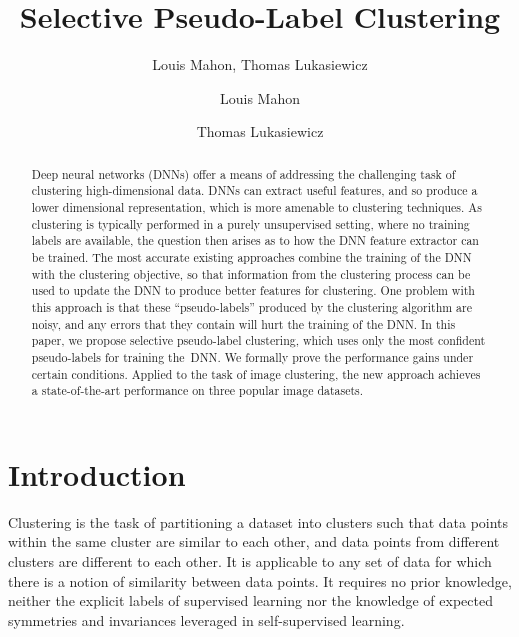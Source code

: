 \documentclass[runningheads]{llncs}
\begin{document}
\title{Selective Pseudo-Label Clustering}
\author{Louis Mahon, Thomas Lukasiewicz}
\author{Louis Mahon \and
Thomas Lukasiewicz}



\maketitle              

\begin{abstract}
Deep neural networks (DNNs) offer a means of addressing the challenging task of clustering high-dimensional data. DNNs can extract useful features, and so produce a lower dimensional representation, which is more amenable to clustering techniques. As clustering is typically performed in a purely unsupervised setting, where no training labels are available, the question then arises as to how the DNN feature extractor can be trained. The most accurate existing approaches combine the training of the DNN with the clustering objective, so that information from the clustering process can be used to update the DNN to produce better features for clustering. One problem with this approach is that these ``pseudo-labels'' produced by the clustering algorithm are noisy, and any errors that they contain will hurt the training of the DNN. In this paper, we propose selective pseudo-label clustering, which uses only the most confident pseudo-labels for training the~DNN. We formally prove the performance gains under certain conditions. Applied to the task of image clustering, the new approach achieves a state-of-the-art performance on three popular image datasets.
\end{abstract} \section{Introduction}
Clustering is the task of  partitioning a dataset into clusters such that data points within the same cluster are similar to each other, and data points from different clusters are different to each other. It is applicable to any set of data for which there is a notion of similarity between data points. It requires no prior knowledge, neither the explicit labels of supervised learning nor the knowledge of expected symmetries and invariances leveraged in self-supervised learning. 
\end{document}
